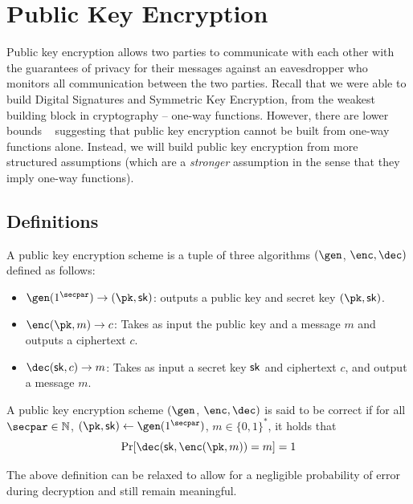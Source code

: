 
\chapter{Public Key Encryption}
Public key encryption allows two parties
to communicate with each other with the guarantees of privacy for their messages against an eavesdropper who monitors all communication between the two parties. Recall that we were able to build Digital Signatures and Symmetric Key Encryption, from the weakest building block in cryptography -- one-way functions. However, there are lower bounds
~\cite{STOC:ImpRud89} 
suggesting that public key encryption cannot be built from one-way functions alone. Instead, we will build public key encryption from more structured assumptions (which are a \emph{stronger} assumption in the sense that they imply one-way functions).

\section{Definitions}
\begin{definition}
    A public key encryption scheme is a tuple of three algorithms $(\gen$, $\enc, \dec)$ defined as follows:
    \begin{itemize}
        \item $\gen(1^\secpar) \to (\pk, \sk)$: outputs a public key and secret key $(\pk, \sk)$.

        \item $\enc(\pk, m) \to c$: Takes as input the public key and a message $m$ and outputs a ciphertext $c$.

        \item $\dec(\sk, c) \to m$: Takes as input a secret key $\mathsf{sk}$ and ciphertext $c$, and output a message $m$.
    \end{itemize}
\end{definition}

\begin{definition}
    A public key encryption scheme $(\gen$, $\enc, \dec)$ is said to be correct if for all $\secpar \in \mathbb{N}$, $(\pk, \sk) \gets \gen(1^\secpar)$, $m \in \{0,1\}^*$, it holds that
    \[\Pr[\dec(\sk, \enc(\pk, m)) = m] = 1\]
\end{definition}
The above definition can be relaxed to allow for a negligible probability of error during decryption and still remain meaningful.

